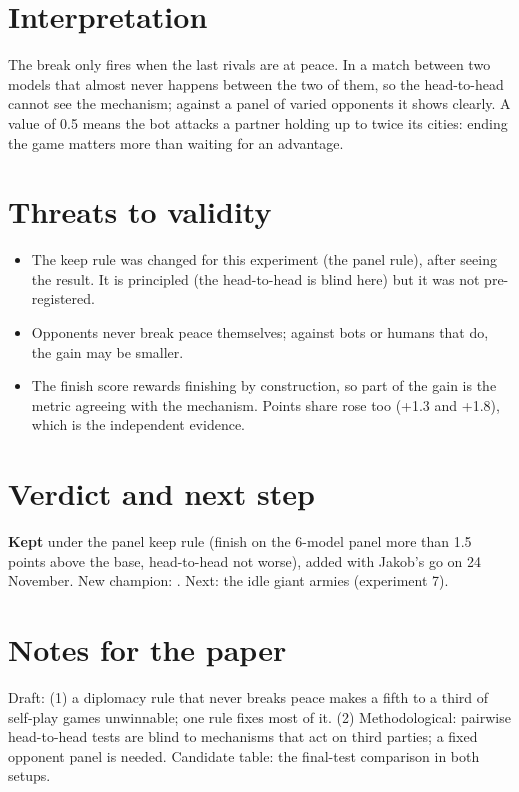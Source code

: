 \documentclass{../polyexp}
\begin{document}
\section{Interpretation}
The break only fires when the last rivals are at peace. In a match between two models that almost never happens between the two of them, so the head-to-head cannot see the mechanism; against a panel of varied opponents it shows clearly. A value of 0.5 means the bot attacks a partner holding up to twice its cities: ending the game matters more than waiting for an advantage.


\section{Threats to validity}
\begin{itemize}
\item The keep rule was changed for this experiment (the panel rule), after seeing the result. It is principled (the head-to-head is blind here) but it was not pre-registered.
\item Opponents never break peace themselves; against bots or humans that do, the gain may be smaller.
\item The finish score rewards finishing by construction, so part of the gain is the metric agreeing with the mechanism. Points share rose too (+1.3 and +1.8), which is the independent evidence.
\end{itemize}

\section{Verdict and next step}
\textbf{Kept} under the panel keep rule (finish on the 6-model panel more than 1.5 points above the base, head-to-head not worse), added with Jakob's go on 24 November. New champion: . Next: the idle giant armies (experiment 7).

\section{Notes for the paper}
Draft: (1) a diplomacy rule that never breaks peace makes a fifth to a third of self-play games unwinnable; one rule fixes most of it. (2) Methodological: pairwise head-to-head tests are blind to mechanisms that act on third parties; a fixed opponent panel is needed. Candidate table: the final-test comparison in both setups.

\end{document}
